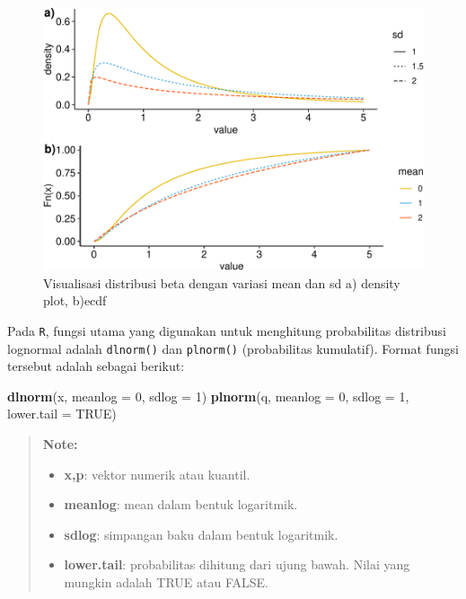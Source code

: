 \documentclass[]{book}
\newenvironment{Shaded}{\begin{snugshade}}{\end{snugshade}}
\newcommand{\KeywordTok}[1]{\textcolor[rgb]{0.13,0.29,0.53}{\textbf{#1}}}
\newcommand{\DataTypeTok}[1]{\textcolor[rgb]{0.13,0.29,0.53}{#1}}
\newcommand{\DecValTok}[1]{\textcolor[rgb]{0.00,0.00,0.81}{#1}}
\newcommand{\OtherTok}[1]{\textcolor[rgb]{0.56,0.35,0.01}{#1}}
\newcommand{\NormalTok}[1]{#1}
\providecommand{\tightlist}{%
  \setlength{\itemsep}{0pt}\setlength{\parskip}{0pt}}
\begin{document}
\begin{figure}

{\centering \includegraphics[width=0.9\linewidth]{EnvStat_files/figure-latex/dlognnormalvis-1} 

}

\caption{Visualisasi distribusi beta dengan variasi mean dan sd a) density plot, b)ecdf}\label{fig:dlognnormalvis}
\end{figure}

Pada \texttt{R}, fungsi utama yang digunakan untuk menghitung
probabilitas distribusi lognormal adalah \texttt{dlnorm()} dan
\texttt{plnorm()} (probabilitas kumulatif). Format fungsi tersebut
adalah sebagai berikut:

\begin{Shaded}
\begin{Highlighting}[]
\KeywordTok{dlnorm}\NormalTok{(x, }\DataTypeTok{meanlog =} \DecValTok{0}\NormalTok{, }\DataTypeTok{sdlog =} \DecValTok{1}\NormalTok{)}
\KeywordTok{plnorm}\NormalTok{(q, }\DataTypeTok{meanlog =} \DecValTok{0}\NormalTok{, }\DataTypeTok{sdlog =} \DecValTok{1}\NormalTok{, }\DataTypeTok{lower.tail =} \OtherTok{TRUE}\NormalTok{)}
\end{Highlighting}
\end{Shaded}

\begin{quote}
\textbf{Note: }

\begin{itemize}
\tightlist
\item
  \textbf{x,p}: vektor numerik atau kuantil.
\item
  \textbf{meanlog}: mean dalam bentuk logaritmik.
\item
  \textbf{sdlog}: simpangan baku dalam bentuk logaritmik.
\item
  \textbf{lower.tail}: probabilitas dihitung dari ujung bawah. Nilai
  yang mungkin adalah TRUE atau FALSE.
\end{itemize}
\end{quote}
\end{document}
